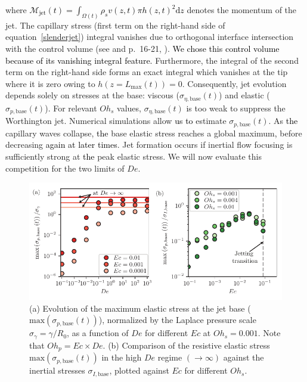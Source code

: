 \documentclass{jfm}
\newcommand{\DL}[1]{{\textcolor{black}{#1}}}
\newcommand{\AO}[1]{{\textcolor{black}{#1}}}
\newcommand{\AKD}[1]{{\textcolor{black}{#1}}}
\newcommand{\oo}{\color{magenta} \normalfont}
\newcommand{\bb}{\color{black} \normalfont}
\begin{document}
\noindent where
\AKD{$\mathcal{M}_{\text{jet}}(t) = \int_{\Omega(t)}\rho_sv(z,t)\pi h(z,t)^2\mathrm{d}z$}
denotes the momentum of the jet.
The capillary stress (first term on the right-hand side of equation~\eqref{slenderjet}) integral vanishes due to orthogonal interface intersection with the control volume (see \citet{marchand2011surface} and p.~16-21, \citet{munro2019coalescence}). \AO{We chose this control volume because of its vanishing integral feature.}
Furthermore, the integral of the second term on the right-hand side forms an exact integral which vanishes at the tip where it is zero owing to $h(z = L_{\text{max}}(t)) = 0$.
Consequently, jet evolution depends solely on stresses at the base: viscous ($\sigma_{\eta,\text{base}}(t)$) and elastic ($\sigma_{p,\text{base}}(t)$).
For relevant $Oh_s$ values, $\sigma_{\eta,\text{base}}(t)$ is too weak to suppress the Worthington jet. Numerical simulations allow \AO{us} \DL{to} estimate $\sigma_{p,\text{base}}(t)$. As \DL{the} capillary waves collapse, \DL{the} base elastic stress reaches a global maximum\DL{,} before decreasing \DL{again at later times}. Jet formation occurs if inertial flow focusing is sufficiently strong at \DL{the} peak elastic stress. We will now evaluate this competition for the two limits of $De$.

\begin{figure}
	\centering
	\includegraphics[width=\textwidth]{Figures/Stress_De-Ec/Stress_De_Ec_03-eps-converted-to.pdf}
	\caption{(a) Evolution of the maximum elastic stress at the jet base ($\text{max}\left(\sigma_{p,\text{base}}(t)\right)$), normalized by the Laplace pressure scale $\sigma_\gamma = \gamma/R_0$, as a function of $De$ for different $Ec$ at $Oh_s = 0.001$. {\oo Note that $Oh_p = Ec\times De$. \bb} (b)  Comparison of the resistive elastic stress $\text{max}\left(\sigma_{p,\text{base}}(t)\right)$ in the high $De$ regime $\left(\to \infty \right)$ against the inertial stresses $\sigma_{I,\text{base}}$, plotted against $Ec$ for different $Oh_s$.}
	\label{stress_De}
\end{figure}
\end{document}

